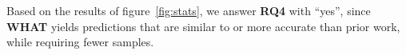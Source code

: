 \documentclass[smallextended]{svjour3}       %
\newcommand{\bi}{\begin{itemize}}%
\newcommand{\ei}{\end{itemize}}
\newcommand{\fig}[1]{Figure~\ref{fig:#1}}
\newcommand{\what}{{\bf WHAT}\xspace}
\begin{document}
% 

% 








\begin{myshadowbox}
Based on the results of figure~\ref{fig:stats}, we answer {\bf RQ4} with ``yes'',
since \what yields predictions that are similar to or more accurate than prior
work, while requiring fewer samples.
\end{myshadowbox}
\end{document}
